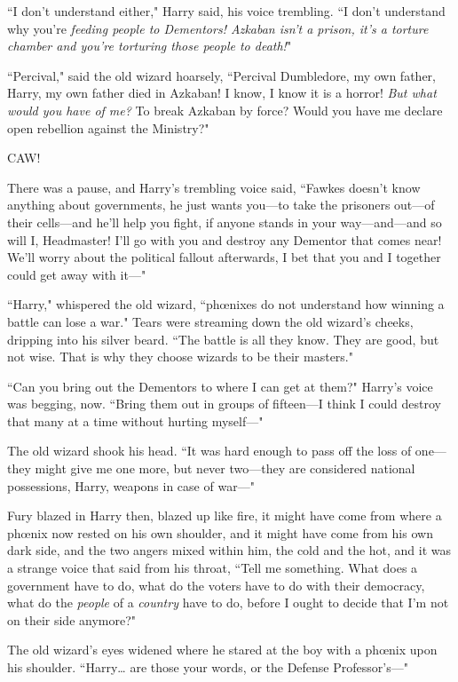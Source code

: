 ``I don't understand either," Harry said, his voice trembling. ``I don't understand why you're \emph{feeding people to Dementors! Azkaban isn't a prison, it's a torture chamber and you're torturing those people to \emph{death}!}"

``Percival," said the old wizard hoarsely, ``Percival Dumbledore, my own father, Harry, my own father died in Azkaban! I know, I know it is a horror! \emph{But what would you have of me?} To break Azkaban by force? Would you have me declare open rebellion against the Ministry?"

CAW!

There was a pause, and Harry's trembling voice said, ``Fawkes doesn't know anything about governments, he just wants you—to take the prisoners out—of their cells—and he'll help you fight, if anyone stands in your way—and—and so will I, Headmaster! I'll go with you and destroy any Dementor that comes near! We'll worry about the political fallout afterwards, I bet that you and I together could get away with it—"

``Harry," whispered the old wizard, ``phœnixes do not understand how winning a battle can lose a war." Tears were streaming down the old wizard's cheeks, dripping into his silver beard. ``The battle is all they know. They are good, but not wise. That is why they choose wizards to be their masters."

``Can you bring out the Dementors to where I can get at them?" Harry's voice was begging, now. ``Bring them out in groups of fifteen—I think I could destroy that many at a time without hurting myself—"

The old wizard shook his head. ``It was hard enough to pass off the loss of one—they might give me one more, but never two—they are considered national possessions, Harry, weapons in case of war—"

Fury blazed in Harry then, blazed up like fire, it might have come from where a phœnix now rested on his own shoulder, and it might have come from his own dark side, and the two angers mixed within him, the cold and the hot, and it was a strange voice that said from his throat, ``Tell me something. What does a government have to do, what do the voters have to do with their democracy, what do the \emph{people} of a \emph{country} have to do, before I ought to decide that I'm not on their side anymore?"

The old wizard's eyes widened where he stared at the boy with a phœnix upon his shoulder. ``Harry{\ldots} are those your words, or the Defense Professor's—"

